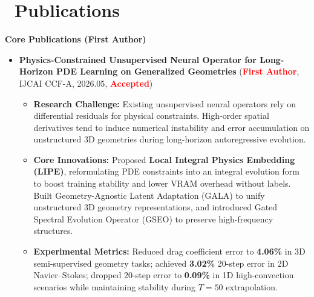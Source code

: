 \documentclass[11pt]{article}
\begin{document}
\section{%
    \makebox[\widthof{\faTrophy}][c]%
    {\color{CVBlue}\faTrophy}\ Publications%
}
\textbf{Core Publications (First Author)}
\begin{itemize}
    \item \textbf{Physics-Constrained Unsupervised Neural Operator for Long-Horizon PDE Learning on Generalized Geometries} (\textcolor{red}{\textbf{First Author}}, IJCAI CCF-A, 2026.05, \textcolor{red}{\textbf{Accepted}})
    \begin{itemize}[label=\tiny$\bullet$, leftmargin=1em]
        \item \textbf{Research Challenge:} Existing unsupervised neural operators rely on differential residuals for physical constraints. High-order spatial derivatives tend to induce numerical instability and error accumulation on unstructured 3D geometries during long-horizon autoregressive evolution.
        \item \textbf{Core Innovations:} Proposed \textbf{Local Integral Physics Embedding (LIPE)}, reformulating PDE constraints into an integral evolution form to boost training stability and lower VRAM overhead without labels. Built Geometry-Agnostic Latent Adaptation (GALA) to unify unstructured 3D geometry representations, and introduced Gated Spectral Evolution Operator (GSEO) to preserve high-frequency structures.
        \item \textbf{Experimental Metrics:} Reduced drag coefficient error to \textbf{4.06\%} in 3D semi-supervised geometry tasks; achieved \textbf{3.02\%} 20-step error in 2D Navier--Stokes; dropped 20-step error to \textbf{0.09\%} in 1D high-convection scenarios while maintaining stability during $T=50$ extrapolation.
    \end{itemize}
    

\end{itemize}
\end{document}
